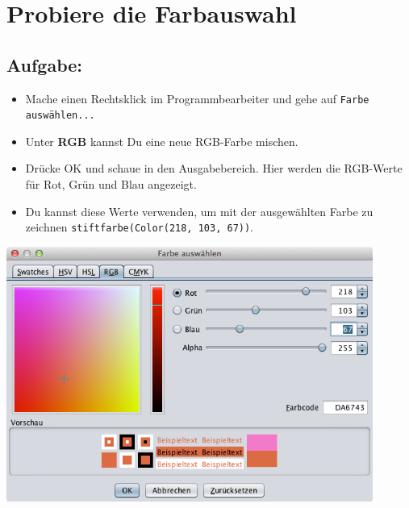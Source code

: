 \chapter{Probiere die Farbauswahl}
\begin{multicols}{2}
\section*{\color{BrickRed}Aufgabe:}


\begin{itemize}

\item {Mache einen Rechtsklick im Programmbearbeiter und gehe auf \lstinline{Farbe auswählen...}}
\item {Unter {\bf RGB} kannst Du eine neue RGB-Farbe mischen.}
\item {Drücke OK und schaue in den Ausgabebereich. Hier werden die RGB-Werte für Rot, Grün und Blau angezeigt.}
\item {Du kannst diese Werte verwenden, um mit der ausgewählten Farbe zu zeichnen \lstinline{stiftfarbe(Color(218, 103, 67))}.}

\end{itemize}



\columnbreak

\begin{center}
\includegraphics[width=12.0cm]{../img/color-chooser-rgb_de.png}
\end{center}

\end{multicols}

